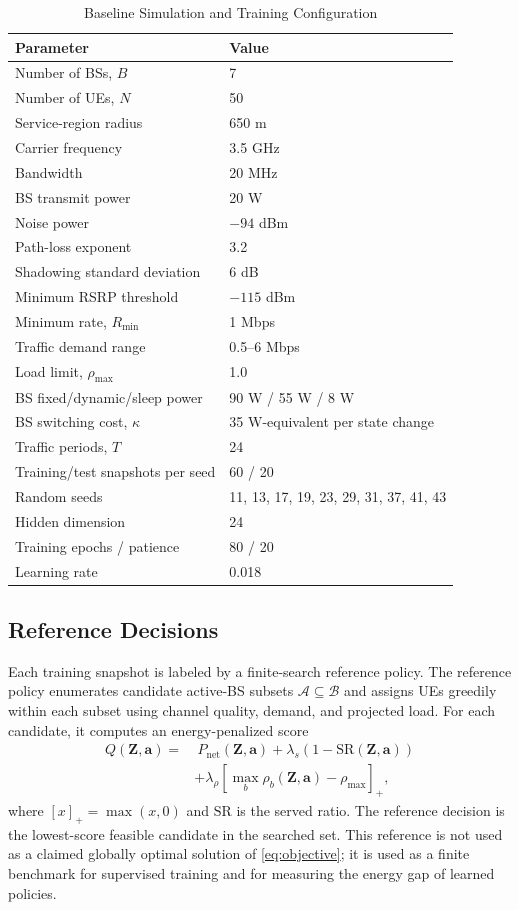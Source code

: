 \documentclass[journal]{IEEEtran}
\begin{document}
\begin{table}[!t]
\caption{Baseline Simulation and Training Configuration}
\label{tab:sim_params}
\centering
\begin{tabular}{ll}
\toprule
Parameter & Value \\
\midrule
Number of BSs, $B$ & 7 \\
Number of UEs, $N$ & 50 \\
Service-region radius & 650 m \\
Carrier frequency & 3.5 GHz \\
Bandwidth & 20 MHz \\
BS transmit power & 20 W \\
Noise power & $-94$ dBm \\
Path-loss exponent & 3.2 \\
Shadowing standard deviation & 6 dB \\
Minimum RSRP threshold & $-115$ dBm \\
Minimum rate, $R_{\min}$ & 1 Mbps \\
Traffic demand range & 0.5--6 Mbps \\
Load limit, $\rho_{\max}$ & 1.0 \\
BS fixed/dynamic/sleep power & 90 W / 55 W / 8 W \\
BS switching cost, $\kappa$ & 35 W-equivalent per state change \\
Traffic periods, $T$ & 24 \\
Training/test snapshots per seed & 60 / 20 \\
Random seeds & 11, 13, 17, 19, 23, 29, 31, 37, 41, 43 \\
Hidden dimension & 24 \\
Training epochs / patience & 80 / 20 \\
Learning rate & 0.018 \\
\bottomrule
\end{tabular}
\end{table}


\subsection{Reference Decisions}
Each training snapshot is labeled by a finite-search reference policy. The
reference policy enumerates candidate active-BS subsets
$\mathcal{A}\subseteq\mathcal{B}$ and assigns UEs greedily within each subset
using channel quality, demand, and projected load. For each candidate, it
computes an energy-penalized score
\begin{align}
    Q(\mathbf{Z},\mathbf{a})
    =&\ P_{\mathrm{net}}(\mathbf{Z},\mathbf{a})
    +\lambda_s\left(1-\mathrm{SR}(\mathbf{Z},\mathbf{a})\right) \nonumber\\
    &+\lambda_{\rho}
    \left[\max_b \rho_b(\mathbf{Z},\mathbf{a})-\rho_{\max}\right]_+,
    \label{eq:reference_score}
\end{align}
where $[x]_+=\max(x,0)$ and $\mathrm{SR}$ is the served ratio. The reference
decision is the lowest-score feasible candidate in the searched set. This
reference is not used as a claimed globally optimal solution of
\eqref{eq:objective}; it is used as a finite benchmark for supervised
training and for measuring the energy gap of learned policies.
\end{document}
